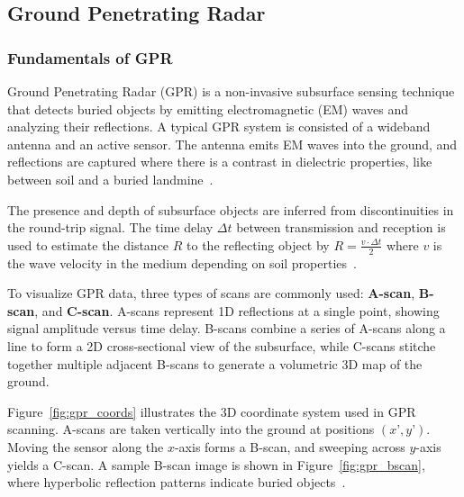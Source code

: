 \subsection{Ground Penetrating Radar}\label{GPR_system}

\subsubsection{Fundamentals of GPR}\label{GPR_fundamental}

Ground Penetrating Radar (GPR) is a non-invasive subsurface sensing technique that detects buried objects by emitting electromagnetic (EM) waves and analyzing their reflections. A typical GPR system is consisted of a wideband antenna and an active sensor. The antenna emits EM waves into the ground, and reflections are captured where there is a contrast in dielectric properties, like between soil and a buried landmine~\cite{paik2002image}.

The presence and depth of subsurface objects are inferred from discontinuities in the round-trip signal. The time delay $\Delta t$ between transmission and reception is used to estimate the distance $R$ to the reflecting object by \( R = \frac{v \cdot \Delta t}{2}\) where $v$ is the wave velocity in the medium depending on soil properties~\cite{paik2002image}.

To visualize GPR data, three types of scans are commonly used: \textbf{A-scan}, \textbf{B-scan}, and \textbf{C-scan}. A-scans represent 1D reflections at a single point, showing signal amplitude versus time delay. B-scans combine a series of A-scans along a line to form a 2D cross-sectional view of the subsurface, while C-scans stitche together multiple adjacent B-scans to generate a volumetric 3D map of the ground. 

Figure~\ref{fig:gpr_coords} illustrates the 3D coordinate system used in GPR scanning. A-scans are taken vertically into the ground at positions $(x’, y’)$. Moving the sensor along the $x$-axis forms a B-scan, and sweeping across $y$-axis yields a C-scan. A sample B-scan image is shown in Figure~\ref{fig:gpr_bscan}, where hyperbolic reflection patterns indicate buried objects~\cite{paik2002image}.

